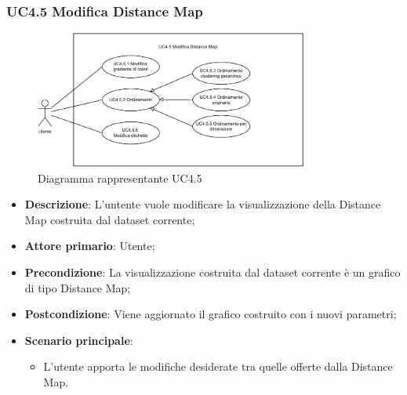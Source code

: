\newpage
\subsubsection{UC4.5 Modifica Distance Map}
\label{ssub:uc4.5}
\begin{figure}[h]
    \centering
    \includegraphics[width=0.8\textwidth]{componenti/casi-duso/diagrammi/UC4_5.pdf}
    \caption{Diagramma rappresentante UC4.5}
    \label{fig:UC4.5}
\end{figure}

\begin{itemize}
    \item \textbf{Descrizione}: L'untente vuole modificare la visualizzazione della Distance Map costruita dal dataset corrente;
    \item \textbf{Attore primario}: Utente;
    \item \textbf{Precondizione}: La visualizzazione costruita dal dataset corrente è un grafico di tipo Distance Map;
    \item \textbf{Postcondizione}: Viene aggiornato il grafico costruito con i nuovi parametri;
    \item \textbf{Scenario principale}: 
    \begin{itemize}
        \item L'utente apporta le modifiche desiderate tra quelle offerte dalla Distance Map.
    \end{itemize}
\end{itemize}

